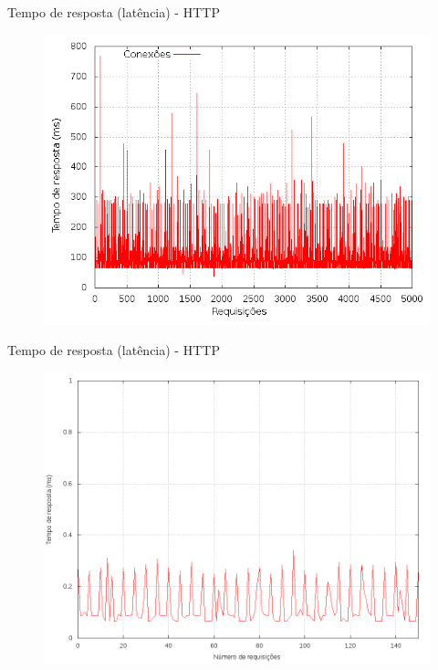 \begin{frame}{Tempo de resposta (latência) - HTTP}

    \begin{figure}[htb!]
        \centering
        \includegraphics[scale=0.35]{images/balancer-http-full}
    \end{figure}
\end{frame}


\begin{frame}{Tempo de resposta (latência) - HTTP}

\begin{figure}[htb!]
    \centering
    \includegraphics[scale=0.35]{images/balancer-http-zoom}
\end{figure}
\end{frame}

